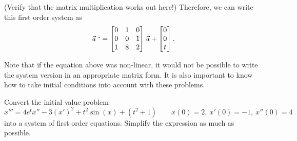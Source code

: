 \begin{exampleSol}
\begin{equation*}
\end{equation*}
(Verify that the matrix multiplication works out here!) Therefore, we can write this first order system as
\begin{equation*}
\vec{u}\ ` = \begin{bmatrix} 0 & 1 & 0 \\ 0 & 0 & 1 \\ 1 & 8 & 2 \end{bmatrix} \vec{u} + \begin{bmatrix} 0 \\ 0 \\ t \end{bmatrix}.
\end{equation*}
\end{exampleSol}

Note that if the equation above was non-linear, it would not be possible to write the system version in an appropriate matrix form. It is also important to know how to take initial conditions into account with these problems.

\begin{example}
Convert the initial value problem
\begin{equation*}
x''' = 4e^t x'' - 3(x')^2 + t^2\sin(x) + (t^2 + 1) \qquad x(0) = 2,\ x'(0) = -1,\ x''(0) = 4
\end{equation*}
into a system of first order equations. Simplify the expression as much as possible.
\end{example}


